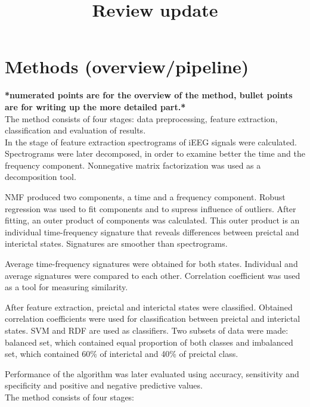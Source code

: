 \documentclass{article}
\title{\fontsize{16}{12}\selectfont{}\textbf{Review update}}
\date{}
\begin{document}
\maketitle

\section{Methods (overview/pipeline)}

\textbf{*numerated points are for the overview of the method, bullet points are for writing up the more detailed part.*} \\

The method consists of four stages: data preprocessing, feature extraction, classification and evaluation of results. \\

In the stage of feature extraction spectrograms of iEEG signals were calculated. Spectrograms were later decomposed, in order to examine better the time and the frequency component. Nonnegative matrix factorization was used as a decomposition tool.  

NMF produced two components, a time and a frequency component. Robust regression was used to fit components and to supress influence of outliers. After fitting, an outer product of components was calculated. This outer product is an individual time-frequency signature that reveals differences between preictal and interictal states. Signatures are smoother than spectrograms. 

Average time-frequency signatures were obtained for both states. Individual and average signatures were compared to each other. Correlation coefficient was used as a tool for measuring similarity. 

After feature extraction, preictal and interictal states were classified. Obtained correlation coefficients were used for classification between preictal and interictal states. SVM and RDF are used as classifiers. Two subsets of data were made: balanced set, which contained equal proportion of both classes and imbalanced set, which contained 60\% of interictal and 40\% of preictal class. 

Performance of the algorithm was later evaluated using accuracy, sensitivity and specificity and positive and negative predictive values. \\



The method consists of four stages:
\end{document}

